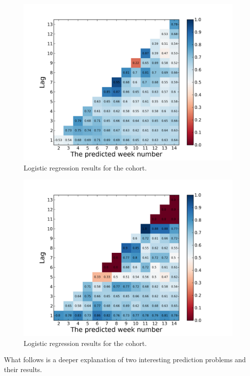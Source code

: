 \begin{figure}[ht!]
  \caption{Logistic regression results for the \both cohort.}\label{fig:logistic_regression_heatmap_forum_and_wiki}
  \centering
    \includegraphics[width=1.0\textwidth]{figures/logreg/forum_and_wiki.png}
\end{figure}

\begin{figure}[ht!]
  \caption{Logistic regression results for the \wiki cohort.}\label{fig:logistic_regression_heatmap_wiki_only}
  \centering
    \includegraphics[width=1.0\textwidth]{figures/logreg/wiki_only.png}
\end{figure}

What follows is a deeper explanation of two interesting prediction problems and their results.


